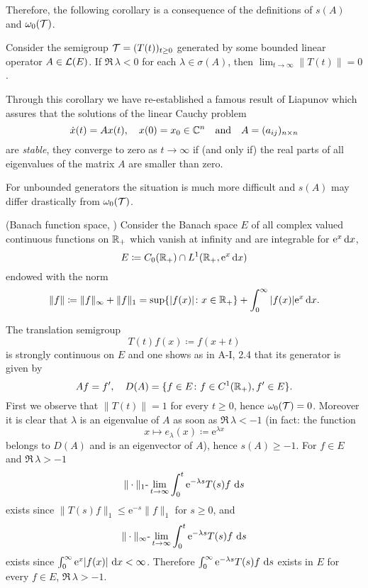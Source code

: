 Therefore, the following corollary is a consequence of the definitions of $s(A)$ and $\omega_{0}(\mathcal{T})$.
\begin{corollary}\label{cor:a3-1.2}
Consider the semigroup $\mathcal{T} = (T(t))_{t \geq 0}$ generated by some bounded linear operator $A \in \mathcal{L}(E)$.
If $\Re\,\lambda < 0$ for each $\lambda \in \sigma(A)$, then $\lim_{t \to \infty}\|T(t)\| = 0$.
\end{corollary}
Through this corollary we have re-established a famous result of Liapunov which assures that the solutions of the linear Cauchy problem
\[
    \dot{x}(t) = Ax(t), \quad x(0) = x_{0} \in \mathbb{C}^{n} \quad \text{and} \quad A = (a_{ij})_{n\times n}
\]
are \emph{stable}, \ie they converge to zero as $t \to \infty$ if (and only if) the real parts of all eigenvalues of the matrix $A$ are smaller than zero.

For unbounded generators the situation is much more difficult and $s(A)$ may differ drastically from $\omega_{0}(\mathcal{T})$.
\begin{example}\label{ex:a3-1.3}(Banach function space, \citet{greinervoigtwolff:1981})
Consider the Banach space $E$ of all complex valued continuous functions on $\mathbb{R}_{+}$ which vanish at infinity and are integrable for $\mathrm{e}^{x}\mathop{}\!\mathrm{d}{x}$, \ie 
\[
    E \coloneqq C_{0}(\mathbb{R}_{+}) \cap L^{1}(\mathbb{R}_{+}, \mathrm{e}^{x}\mathop{}\!\mathrm{d}{x})
\]
endowed with the norm
\[
    \|f\| \coloneqq \|f\|_{\infty} + \|f\|_{1} = \sup\{|f(x)| \colon x \in \mathbb{R}_{+}\} + \int_{0}^{\infty} |f(x)|\mathrm{e}^{x} \mathop{}\!\mathrm{d}{x} .
\]
\end{example}
The translation semigroup
\[
    T(t)f(x) \coloneqq f(x+t)
\]
is strongly continuous on $E$ and one shows as in A-I, 2.4 that its generator is given by
\[
    Af = f', \quad D(A) = \{ f \in E \colon f \in C^{1}(\mathbb{R}_{+}), f' \in E \} .
\]
First we observe that $\|T(t)\| = 1$ for every $t \geq 0$, hence $\omega_{0}(\mathcal{T}) = 0$.
Moreover it is clear that $\lambda$ is an eigenvalue of $A$ as soon as $\Re\,\lambda < -1$ (in fact: the function
\[
    x \mapsto e_{\lambda}(x) \coloneqq \mathrm{e}^{\lambda x}
\]
belongs to $D(A)$ and is an eigenvector of $A$), hence $s(A) \geq -1$.
For $f \in E$ and $\Re \, \lambda > -1$ 
\[
    \|\cdot\|_{1}\text{-}\lim_{t \to \infty} \int_{0}^{t} \mathrm{e}^{-\lambda s}T(s)f \, \mathop{}\!\mathrm{d}{s}
\]
exists since $\|T(s)f\|_{1} \leq \mathrm{e}^{-s}\|f\|_{1}$ for $s \geq 0$, and
\[
    \|\cdot\|_{\infty}\text{-}\lim_{t \to \infty} \int_{0}^{t} \mathrm{e}^{-\lambda s}T(s)f \, \mathop{}\!\mathrm{d}{s}
\]
exists since $\int_{0}^{\infty} \mathrm{e}^{x}|f(x)| \, \mathop{}\!\mathrm{d}{x} < \infty$.
Therefore $\int_{0}^{\infty} \mathrm{e}^{-\lambda s}T(s)f \, \mathop{}\!\mathrm{d}{s}$ exists in $E$ for every $f \in E$, $\Re\,\lambda > -1$.

